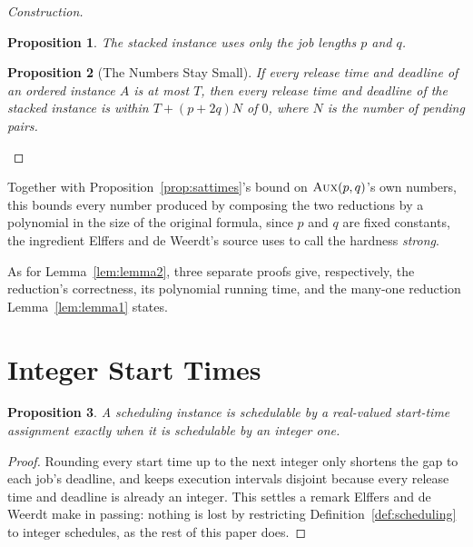 \documentclass[11pt,a4paper]{article}
\newtheorem{proposition}{Proposition}
\theoremstyle{definition}
\newcommand{\AUX}{\textsc{Aux}}
\begin{document}
\begin{proof}[Construction]
\begin{proposition}
The stacked instance uses only the job lengths $p$ and $q$.
\end{proposition}

\begin{proposition}[The Numbers Stay Small]
If every release time and deadline of an ordered instance $A$ is at most
$T$, then every release time and deadline of the stacked instance is within
$T+(p+2q)N$ of $0$, where $N$ is the number of pending pairs.
\end{proposition}
\end{proof}

Together with Proposition~\ref{prop:sattimes}'s bound on $\AUX(p,q)$'s own numbers,
this bounds every number produced by composing the two reductions by a
polynomial in the size of the original formula, since $p$ and $q$ are fixed
constants, the ingredient Elffers and de Weerdt's source uses to call the
hardness \emph{strong}.

As for Lemma~\ref{lem:lemma2}, three separate proofs give, respectively,
the reduction's correctness,
its polynomial running time,
and
the many-one reduction Lemma~\ref{lem:lemma1} states.

\section{Integer Start Times}

\begin{proposition}
A scheduling instance is schedulable by a real-valued start-time assignment
exactly when it is schedulable by an integer one.
\end{proposition}
\begin{proof}
Rounding every start time up to the next integer only shortens the gap to
each job's deadline, and keeps execution intervals disjoint because every
release time and deadline is already an integer.
This settles a remark Elffers and de Weerdt make in passing: nothing is lost
by restricting Definition~\ref{def:scheduling} to integer schedules, as the rest of
this paper does.
\end{proof}
\end{document}
